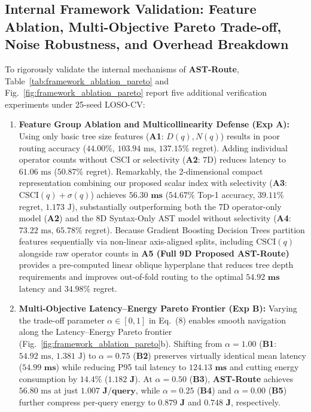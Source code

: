 \documentclass[10pt,a4paper]{article}
\begin{document}
\subsection{Internal Framework Validation: Feature Ablation, Multi-Objective Pareto Trade-off, Noise Robustness, and Overhead Breakdown}
To rigorously validate the internal mechanisms of \textbf{AST-Route}, Table~\ref{tab:framework_ablation_pareto} and Fig.~\ref{fig:framework_ablation_pareto} report five additional verification experiments under 25-seed LOSO-CV:
\begin{enumerate}[leftmargin=1.5em,itemsep=2pt]
    \item \textbf{Feature Group Ablation and Multicollinearity Defense (Exp A):} Using only basic tree size features (\textbf{A1}: $D(q), N(q)$) results in poor routing accuracy ($44.00\%$, $103.94\text{ ms}$, $137.15\%$ regret). Adding individual operator counts without CSCI or selectivity (\textbf{A2}: $7\text{D}$) reduces latency to $61.06\text{ ms}$ ($50.87\%$ regret). Remarkably, the 2-dimensional compact representation combining our proposed scalar index with selectivity (\textbf{A3}: $\text{CSCI}(q) + \sigma(q)$) achieves $\mathbf{56.30\text{ ms}}$ ($54.67\%$ Top-1 accuracy, $39.11\%$ regret, $1.173\text{ J}$), substantially outperforming both the 7D operator-only model (\textbf{A2}) and the 8D Syntax-Only AST model without selectivity (\textbf{A4}: $73.22\text{ ms}$, $65.78\%$ regret). Because Gradient Boosting Decision Trees partition features sequentially via non-linear axis-aligned splits, including $\text{CSCI}(q)$ alongside raw operator counts in \textbf{A5 (Full 9D Proposed AST-Route)} provides a pre-computed linear oblique hyperplane that reduces tree depth requirements and improves out-of-fold routing to the optimal $\mathbf{54.92\text{ ms}}$ latency and $\mathbf{34.98\%}$ regret.
    \item \textbf{Multi-Objective Latency--Energy Pareto Frontier (Exp B):} Varying the trade-off parameter $\alpha \in [0, 1]$ in Eq.~(8) enables smooth navigation along the Latency--Energy Pareto frontier (Fig.~\ref{fig:framework_ablation_pareto}b). Shifting from $\alpha = 1.00$ (\textbf{B1}: $54.92\text{ ms}$, $1.381\text{ J}$) to $\alpha = 0.75$ (\textbf{B2}) preserves virtually identical mean latency ($\mathbf{54.99\text{ ms}}$) while reducing P95 tail latency to $\mathbf{124.13\text{ ms}}$ and cutting energy consumption by $\mathbf{14.4\%}$ ($\mathbf{1.182\text{ J}}$). At $\alpha = 0.50$ (\textbf{B3}), \textbf{AST-Route} achieves $56.80\text{ ms}$ at just $\mathbf{1.007\text{ J/query}}$, while $\alpha = 0.25$ (\textbf{B4}) and $\alpha = 0.00$ (\textbf{B5}) further compress per-query energy to $\mathbf{0.879\text{ J}}$ and $\mathbf{0.748\text{ J}}$, respectively.

\end{enumerate}
\end{document}
